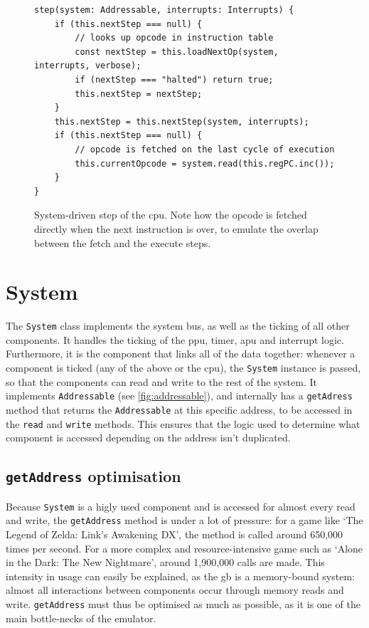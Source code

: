 \documentclass[11pt]{report}
\begin{document}
\begin{figure}[h]
    \begin{verbatim}
step(system: Addressable, interrupts: Interrupts) {
    if (this.nextStep === null) {
        // looks up opcode in instruction table
        const nextStep = this.loadNextOp(system, interrupts, verbose);
        if (nextStep === "halted") return true;
        this.nextStep = nextStep;
    }
    this.nextStep = this.nextStep(system, interrupts);
    if (this.nextStep === null) {
        // opcode is fetched on the last cycle of execution
        this.currentOpcode = system.read(this.regPC.inc());
    }
}
    \end{verbatim}
    \caption{System-driven step of the \gls{cpu}. Note how the opcode is fetched directly when the next instruction is over, to emulate the overlap between the fetch and the execute steps.}
    \label{fig:system-driven-cpu-tick}
\end{figure}


\section{System}

The \texttt{System} class implements the system bus, as well as the ticking of all other components. It handles the ticking of the \gls{ppu}, timer, \gls{apu} and interrupt logic. Furthermore, it is the component that links all of the data together: whenever a component is ticked (any of the above or the \gls{cpu}), the \texttt{System} instance is passed, so that the components can read and write to the rest of the system. It implements \texttt{Addressable} (see \ref{fig:addressable}), and internally has a \texttt{getAdress} method that returns the \texttt{Addressable} at this specific address, to be accessed in the \texttt{read} and \texttt{write} methods. This ensures that the logic used to determine what component is accessed depending on the address isn't duplicated.

\subsection{\texttt{getAddress} optimisation}

Because \texttt{System} is a higly used component and is accessed for almost every read and write, the \texttt{getAddress} method is under a lot of pressure: for a game like `The Legend of Zelda: Link's Awakening DX', the method is called around 650,000 times per second. For a more complex and resource-intensive game such as `Alone in the Dark: The New Nightmare', around 1,900,000 calls are made. This intensity in usage can easily be explained, as the \gls{gb} is a memory-bound system: almost all interactions between components occur through memory reads and write. \texttt{getAddress} must thus be optimised as much as possible, as it is one of the main bottle-necks of the emulator.
\end{document}
